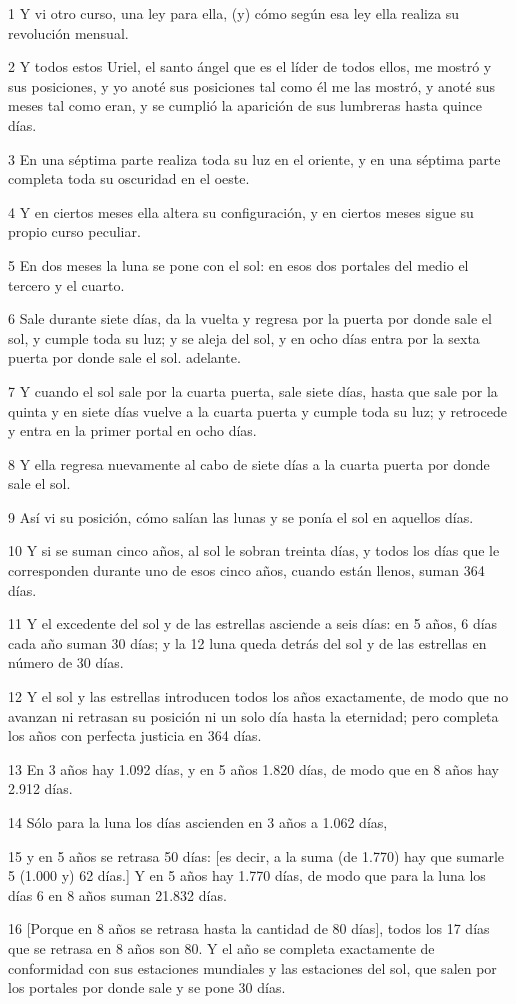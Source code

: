 \par 1 Y vi otro curso, una ley para ella, (y) cómo según esa ley ella realiza su revolución mensual.
\par 2 Y todos estos Uriel, el santo ángel que es el líder de todos ellos, me mostró y sus posiciones, y yo anoté sus posiciones tal como él me las mostró, y anoté sus meses tal como eran, y se cumplió la aparición de sus lumbreras hasta quince días.
\par 3 En una séptima parte realiza toda su luz en el oriente, y en una séptima parte completa toda su oscuridad en el oeste.
\par 4 Y en ciertos meses ella altera su configuración, y en ciertos meses sigue su propio curso peculiar.
\par 5 En dos meses la luna se pone con el sol: en esos dos portales del medio el tercero y el cuarto.
\par 6 Sale durante siete días, da la vuelta y regresa por la puerta por donde sale el sol, y cumple toda su luz; y se aleja del sol, y en ocho días entra por la sexta puerta por donde sale el sol. adelante.
\par 7 Y cuando el sol sale por la cuarta puerta, sale siete días, hasta que sale por la quinta y en siete días vuelve a la cuarta puerta y cumple toda su luz; y retrocede y entra en la primer portal en ocho días.
\par 8 Y ella regresa nuevamente al cabo de siete días a la cuarta puerta por donde sale el sol.
\par 9 Así vi su posición, cómo salían las lunas y se ponía el sol en aquellos días.
\par 10 Y si se suman cinco años, al sol le sobran treinta días, y todos los días que le corresponden durante uno de esos cinco años, cuando están llenos, suman 364 días.
\par 11 Y el excedente del sol y de las estrellas asciende a seis días: en 5 años, 6 días cada año suman 30 días; y la 12 luna queda detrás del sol y de las estrellas en número de 30 días.
\par 12 Y el sol y las estrellas introducen todos los años exactamente, de modo que no avanzan ni retrasan su posición ni un solo día hasta la eternidad; pero completa los años con perfecta justicia en 364 días.
\par 13 En 3 años hay 1.092 días, y en 5 años 1.820 días, de modo que en 8 años hay 2.912 días.
\par 14 Sólo para la luna los días ascienden en 3 años a 1.062 días,
\par 15 y en 5 años se retrasa 50 días: [es decir, a la suma (de 1.770) hay que sumarle 5 (1.000 y) 62 días.] Y en 5 años hay 1.770 días, de modo que para la luna los días 6 en 8 años suman 21.832 días.
\par 16 [Porque en 8 años se retrasa hasta la cantidad de 80 días], todos los 17 días que se retrasa en 8 años son 80. Y el año se completa exactamente de conformidad con sus estaciones mundiales y las estaciones del sol, que salen por los portales por donde sale y se pone 30 días.

